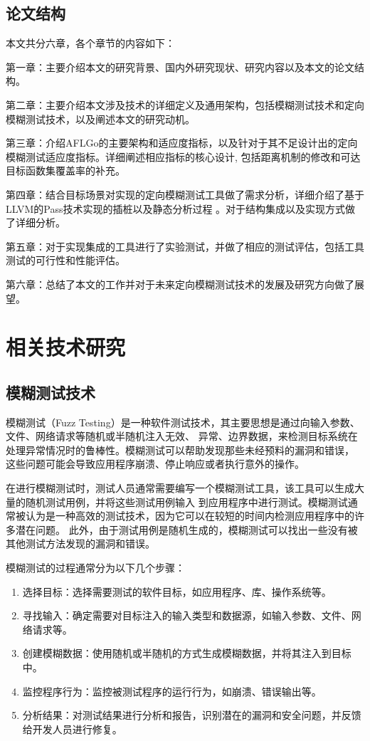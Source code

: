 \documentclass[bachelor]{njupthesis}
\begin{document}
\section{论文结构}
本文共分六章，各个章节的内容如下：

第一章：主要介绍本文的研究背景、国内外研究现状、研究内容以及本文的论文结构。

第二章：主要介绍本文涉及技术的详细定义及通用架构，包括模糊测试技术和定向模糊测试技术，以及阐述本文的研究动机。

第三章：介绍AFLGo的主要架构和适应度指标，以及针对于其不足设计出的定向模糊测试适应度指标。详细阐述相应指标的核心设计,
包括距离机制的修改和可达目标函数集覆盖率的补充。

第四章：结合目标场景对实现的定向模糊测试工具做了需求分析，详细介绍了基于LLVM的Pass技术实现的插桩以及静态分析过程
。对于结构集成以及实现方式做了详细分析。

第五章：对于实现集成的工具进行了实验测试，并做了相应的测试评估，包括工具测试的可行性和性能评估。

第六章：总结了本文的工作并对于未来定向模糊测试技术的发展及研究方向做了展望。

\chapter{相关技术研究}
\section{模糊测试技术}
模糊测试（Fuzz Testing）是一种软件测试技术，其主要思想是通过向输入参数、文件、网络请求等随机或半随机注入无效、
异常、边界数据，来检测目标系统在处理异常情况时的鲁棒性。模糊测试可以帮助发现那些未经预料的漏洞和错误，
这些问题可能会导致应用程序崩溃、停止响应或者执行意外的操作。

在进行模糊测试时，测试人员通常需要编写一个模糊测试工具，该工具可以生成大量的随机测试用例，并将这些测试用例输入
到应用程序中进行测试。模糊测试通常被认为是一种高效的测试技术，因为它可以在较短的时间内检测应用程序中的许多潜在问题。
此外，由于测试用例是随机生成的，模糊测试可以找出一些没有被其他测试方法发现的漏洞和错误。

模糊测试的过程通常分为以下几个步骤：

\begin{enumerate}[label=(\arabic*)]
	\item 选择目标：选择需要测试的软件目标，如应用程序、库、操作系统等。
	\item 寻找输入：确定需要对目标注入的输入类型和数据源，如输入参数、文件、网络请求等。
	\item 创建模糊数据：使用随机或半随机的方式生成模糊数据，并将其注入到目标中。
	\item 监控程序行为：监控被测试程序的运行行为，如崩溃、错误输出等。
	\item 分析结果：对测试结果进行分析和报告，识别潜在的漏洞和安全问题，并反馈给开发人员进行修复。
\end{enumerate}
\end{document}
